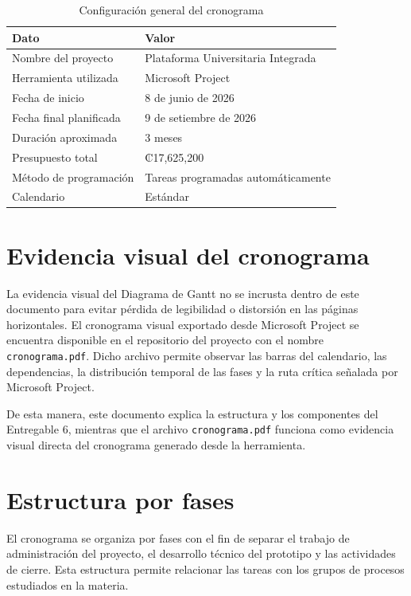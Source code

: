 \documentclass[11pt,spanish]{article}
\begin{document}
\begin{table}[H]
\centering
\caption{Configuración general del cronograma}
\begin{tabularx}{\textwidth}{p{5cm} Y}
\toprule
\textbf{Dato} & \textbf{Valor} \\
\midrule
Nombre del proyecto & Plataforma Universitaria Integrada \\
Herramienta utilizada & Microsoft Project \\
Fecha de inicio & 8 de junio de 2026 \\
Fecha final planificada & 9 de setiembre de 2026 \\
Duración aproximada & 3 meses \\
Presupuesto total & ₡17,625,200 \\
Método de programación & Tareas programadas automáticamente \\
Calendario & Estándar \\
\bottomrule
\end{tabularx}
\end{table}

\section{Evidencia visual del cronograma}

La evidencia visual del Diagrama de Gantt no se incrusta dentro de este documento para evitar pérdida de legibilidad o distorsión en las páginas horizontales. El cronograma visual exportado desde Microsoft Project se encuentra disponible en el repositorio del proyecto con el nombre \texttt{cronograma.pdf}. Dicho archivo permite observar las barras del calendario, las dependencias, la distribución temporal de las fases y la ruta crítica señalada por Microsoft Project.

De esta manera, este documento explica la estructura y los componentes del Entregable 6, mientras que el archivo \texttt{cronograma.pdf} funciona como evidencia visual directa del cronograma generado desde la herramienta.

\section{Estructura por fases}

El cronograma se organiza por fases con el fin de separar el trabajo de administración del proyecto, el desarrollo técnico del prototipo y las actividades de cierre. Esta estructura permite relacionar las tareas con los grupos de procesos estudiados en la materia.
\end{document}
